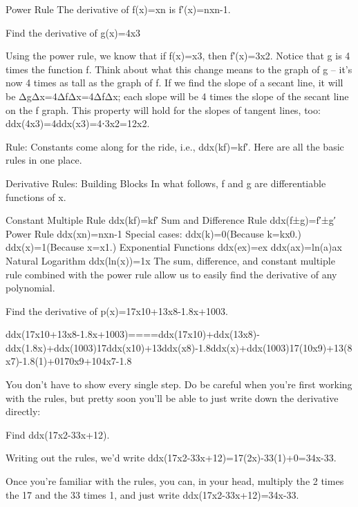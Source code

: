 Power Rule
The derivative of f(x)=xn is
f′(x)=nxn-1.
\begin{example}
Find the derivative of g(x)=4x3
\begin{solution} Using the power rule, we know that if f(x)=x3, then f′(x)=3x2. Notice that g is 4 times the function f. Think about what this change means to the graph of g – it’s now 4 times as tall as the graph of f. If we find the slope of a secant line, it will be ΔgΔx=4ΔfΔx=4ΔfΔx; each slope will be 4 times the slope of the secant line on the f graph. This property will hold for the slopes of tangent lines, too:
ddx(4x3)=4ddx(x3)=4⋅3x2=12x2.
\end{solution}\end{example}
Rule:
Constants come along for the ride, i.e., ddx(kf)=kf′.
Here are all the basic rules in one place.

Derivative Rules: Building Blocks
In what follows, f and g are differentiable functions of x.

Constant Multiple Rule
ddx(kf)=kf′
Sum and Difference Rule
ddx(f±g)=f′±g′
Power Rule
ddx(xn)=nxn-1
Special cases:
ddx(k)=0(Because k=kx0.)
ddx(x)=1(Because x=x1.)
Exponential Functions
ddx(ex)=ex
ddx(ax)=ln(a)ax
Natural Logarithm
ddx(ln(x))=1x
The sum, difference, and constant multiple rule combined with the power rule allow us to easily find the derivative of any polynomial.

\begin{example}
Find the derivative of p(x)=17x10+13x8-1.8x+1003.

\begin{solution} ddx(17x10+13x8-1.8x+1003)====ddx(17x10)+ddx(13x8)-ddx(1.8x)+ddx(1003)17ddx(x10)+13ddx(x8)-1.8ddx(x)+ddx(1003)17(10x9)+13(8x7)-1.8(1)+0170x9+104x7-1.8
\end{solution}\end{example}
You don't have to show every single step. Do be careful when you're first working with the rules, but pretty soon you’ll be able to just write down the derivative directly:

\begin{example}
Find ddx(17x2-33x+12).

\begin{solution} Writing out the rules, we'd write
ddx(17x2-33x+12)=17(2x)-33(1)+0=34x-33.

Once you're familiar with the rules, you can, in your head, multiply the 2 times the 17 and the 33 times 1, and just write
ddx(17x2-33x+12)=34x-33.
\end{solution}\end{example}

